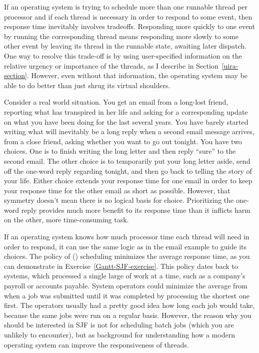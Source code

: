 If an operating system is trying to schedule more than one runnable thread
per processor and if each thread is necessary in order to
respond to some event, then response time inevitably involves
tradeoffs.  Responding more quickly to one event by running the
corresponding thread means responding more slowly to some other event
by leaving its thread in the runnable state, awaiting later
dispatch.  One way to resolve this trade-off is by using
user-specified information on the relative urgency or importance of
the threads, as I describe in Section~\ref{uira-section}.  However, even without that
information, the operating system may be able to do better than just
shrug its virtual shoulders.

Consider a real world situation.  You get an email from a long-lost
friend, reporting what has transpired in her life and asking for a
corresponding update on what you have been doing for the last several
years.  You have barely started writing what will inevitably be a long
reply when a second email message arrives, from a close friend, asking
whether you want to go out tonight.  You have two choices.  One is to
finish writing the long letter and then reply ``sure'' to the second
email.  The other choice is to temporarily put your long letter aside,
send off the one-word reply regarding tonight, and then go back to
telling the story of your life.  Either choice extends your response
time for one email in order to keep your response time for the other
email as short as possible.  However, that symmetry doesn't mean there is no logical
basis for choice.  Prioritizing the one-word reply provides much more
benefit to its response time than it inflicts harm on the other, more
time-consuming task.

If an operating system knows how much processor time each thread will
need in order to respond, it can use the same logic as in the email
example to guide its choices.  The policy of  () scheduling minimizes the average response time,
as you can demonstrate in Exercise~\ref{Gantt-SJF-exercise}.
This policy dates back to  systems, which processed a
single large  of work at a time, such as a company's
payroll or accounts payable.  System operators could minimize the
average  from when a job was submitted until it
was completed by processing the shortest one first.  The operators
usually had a pretty good idea how long each job would take, because
the same jobs were run on a regular basis.  However, the reason why
you should be interested in SJF is not for scheduling batch jobs
(which you are unlikely to encounter), but as background for
understanding how a modern operating system can improve the
responsiveness of threads.

